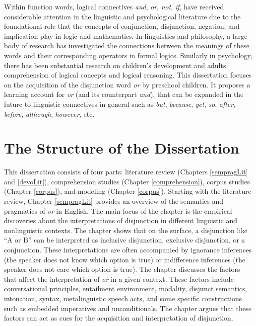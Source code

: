 \documentclass[oneside]{report}
\theoremstyle{definition}
\theoremstyle{definition}
\theoremstyle{definition}
\theoremstyle{remark}
\begin{document}
Within function words, logical connectives \emph{and}, \emph{or},
\emph{not}, \emph{if}, have received considerable attention in the
linguistic and psychological literature due to the foundational role
that the concepts of conjunction, disjunction, negation, and implication
play in logic and mathematics. In linguistics and philosophy, a large
body of research has investigated the connections between the meanings
of these words and their corresponding operators in formal logics.
Similarly in psychology, there has been substantial research on
children's development and adults comprehension of logical concepts and
logical reasoning. This dissertation focuses on the acquisition of the
disjunction word \emph{or} by preschool children. It proposes a learning
account for \emph{or} (and its counterpart \emph{and}), that can be
expanded in the future to linguistic connectives in general such as
\emph{but}, \emph{because}, \emph{yet}, \emph{so}, \emph{after},
\emph{before}, \emph{although}, \emph{however}, etc.

\section{The Structure of the
Dissertation}\label{the-structure-of-the-dissertation}

This dissertation consists of four parts: literature review (Chapters
\ref{sempragLit} and \ref{devoLit}), comprehension studies (Chapter
\ref{comprehension}), corpus studies (Chapter \ref{corpus}), and
modeling (Chapter \ref{corpus}). Starting with the literature review,
Chapter \ref{sempragLit} provides an overview of the semantics and
pragmatics of \emph{or} in English. The main focus of the chapter is the
empirical discoveries about the interpretations of disjunction in
different linguistic and nonlinguistic contexts. The chapter shows that
on the surface, a disjunction like ``A or B'' can be interpreted as
inclusive disjunction, exclusive disjunction, or a conjunction. These
interpretations are often accompanied by ignorance inferences (the
speaker does not know which option is true) or indifference inferences
(the speaker does not care which option is true). The chapter discusses
the factors that affect the interpretation of \emph{or} in a given
context. These factors include conversational principles, entailment
environment, modality, disjunct semantics, intonation, syntax,
metalinguistic speech acts, and some specific constructions such as
embedded imperatives and unconditionals. The chapter argues that these
factors can act as cues for the acquisition and interpretation of
disjunction.
\end{document}
